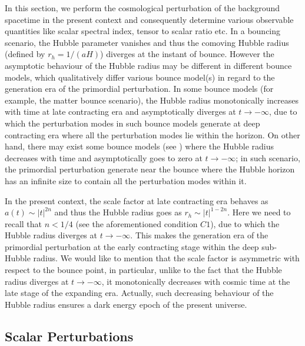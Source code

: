\documentclass{article}
\begin{document}
 In this section, we perform the cosmological perturbation of the background spacetime in the present context and consequently determine 
 various observable quantities like scalar spectral index, tensor to scalar ratio etc. In a bouncing scenario, the Hubble parameter vanishes 
 and thus the comoving Hubble radius (defined by $r_h = 1/(aH)$) diverges at the instant of bounce. However the asymptotic behaviour of the Hubble radius 
 may be different in different bounce models, which qualitatively differ various bounce model(s) in regard to the generation era 
 of the primordial perturbation. In some bounce models (for example, the matter bounce scenario), the Hubble radius monotonically 
 increases with time at late contracting era and asymptotically diverges at $t \rightarrow -\infty$, due to which the perturbation modes 
 in such bounce models generate at deep contracting era where all the perturbation modes lie within the horizon. On other hand, there may exist 
 some bounce models (see \cite{Odintsov:2020zct}) where the Hubble radius decreases with time and asymptotically goes to zero at $t \rightarrow -\infty$; 
 in such scenario, the primordial perturbation generate near the bounce where the Hubble horizon has an infinite size to contain all the perturbation 
 modes within it.
 
 In the present context, the scale factor at late contracting era behaves as $a(t) \sim |t|^{2n}$ and thus the Hubble radius goes as 
 $r_h \sim |t|^{1-2n}$. Here we need to recall that $n < 1/4$ (see the aforementioned condition $C1$), due to which the Hubble radius diverges at 
 $t \rightarrow -\infty$. This makes the generation era of the primordial perturbation at the early contracting stage within the deep 
 sub-Hubble radius. We would like to mention that the scale factor is asymmetric with respect to the bounce point, in 
 particular, unlike to the fact that the Hubble radius diverges at $t \rightarrow -\infty$, it monotonically decreases with cosmic time 
 at the late stage of the expanding era. Actually, such decreasing behaviour of the Hubble radius ensures a dark energy epoch of the present universe.  
 
 \subsection{Scalar Perturbations}
\end{document}
